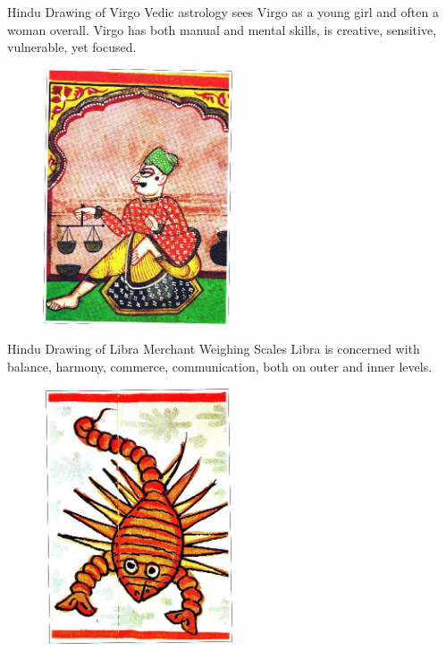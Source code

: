  

Hindu Drawing of Virgo
Vedic astrology sees Virgo as a young girl and often a woman overall.
Virgo has both manual and mental skills, is creative, sensitive, vulnerable, yet focused.

 
\begin{figure}[H]
 \centering
\includegraphics[width=0.5\textwidth]{pics/Libra.png}
 \end{figure}


 

Hindu Drawing of Libra
Merchant Weighing Scales
Libra is concerned with balance, harmony, commerce, communication, both on outer and inner levels.

 

\begin{figure}[H]
 \centering
\includegraphics[width=0.5\textwidth]{pics/Scorpio.png}
 \end{figure}

